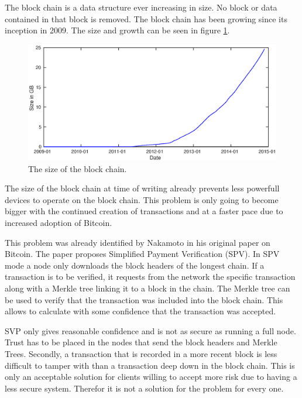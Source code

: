 The block chain is a data structure ever increasing in size.
No block or data contained in that block is removed.
The block chain has been growing since its inception in 2009.
The size and growth can be seen in figure \ref{fig:bc-size}.

\begin{figure}[H]
        \centerline{\includegraphics[scale=0.6]{relatedWork/figs/blockchainsize/blockchainsize.eps}}
        \caption{The size of the block chain.\cite{Blockchain.info-bcs}}
	\label{fig:bc-size}
\end{figure}

The size of the block chain at time of writing already prevents less powerfull devices
to operate on the block chain.
This problem is only going to become bigger with the continued creation of transactions
and at a faster pace due to increased adoption of Bitcoin.

This problem was already identified by Nakamoto in his original paper on Bitcoin.
The paper proposes Simplified Payment Verification (SPV).
In SPV mode a node only downloads the block headers of the longest chain.
If a transaction is to be verified, it requests from the network the specific transaction
along with a Merkle tree linking it to a block in the chain.
The Merkle tree can be used to verify that the transaction was included into the block chain.
This allows to calculate with some confidence that the transaction was accepted.

SVP only gives reasonable confidence and is not as secure as running a full node.
Trust has to be placed in the nodes that send the block headers and Merkle Trees.
Secondly, a transaction that is recorded in a more recent block is less difficult to tamper with
than a transaction deep down in the block chain.
This is only an acceptable solution for clients willing to accept more risk due to having a less secure system.
Therefor it is not a solution for the problem for every one.

